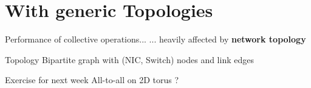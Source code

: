 \documentclass[xcolor={rgb,x11names,svgnames},rgb,x11names,svgnames]{beamer}
\begin{document}

\section{With generic Topologies}


\begin{frame}

  \vfill
  \large

  \begin{alertblock}{Performance of collective operations...}
    ... heavily affected by \textbf{network topology}
  \end{alertblock}

  \vfill

  \begin{block}{Topology}
    Bipartite graph with (NIC, Switch) nodes and link edges
  \end{block}

  \vfill

  \begin{exampleblock}{Exercise for next week}
    All-to-all on 2D torus ?
  \end{exampleblock}

  
  \vfill
\end{frame}

\end{document}
